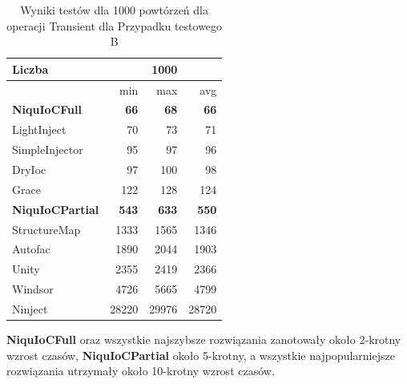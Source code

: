 \documentclass[12pt]{article}
\begin{document}
\begin{table}[H]
\captionsetup{belowskip=0pt,aboveskip=0pt}
\begin{center}
\begin{small}
	\begin{tabular}{ | l | r r r | }
    		\hline
Liczba & & 1000 & \\ \hline
 & min & max & avg \\ \hline
\textbf{NiquIoCFull} & \textbf{66} & \textbf{68} & \textbf{66} \\ \hline
LightInject & 70 & 73 & 71 \\ \hline
SimpleInjector & 95 & 97 & 96 \\ \hline
DryIoc & 97 & 100 & 98 \\ \hline
Grace & 122 & 128 & 124 \\ \hline
\textbf{NiquIoCPartial} & \textbf{543} & \textbf{633} & \textbf{550} \\ \hline
StructureMap & 1333 & 1565 & 1346 \\ \hline
Autofac & 1890 & 2044 & 1903 \\ \hline
Unity & 2355 & 2419 & 2366 \\ \hline
Windsor & 4726 & 5665 & 4799 \\ \hline
Ninject & 28220 & 29976 & 28720 \\ \hline
  	\end{tabular}
\end{small}
\end{center}
\caption{Wyniki testów dla 1000 powtórzeń dla operacji Transient dla Przypadku testowego B}
\label{TestCaseB_Transient1000}
\end{table}
\textbf{NiquIoCFull} oraz wszystkie najszybsze rozwiązania zanotowały około 2-krotny wzrost czasów, \textbf{NiquIoCPartial} około 5-krotny, a wszystkie najpopularniejsze rozwiązania utrzymały około 10-krotny wzrost czasów.
\end{document}
